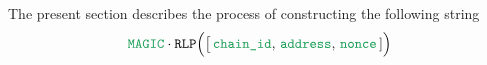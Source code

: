 The present section describes the process of constructing the following string
\[
	\locMagic \cdot \rlp\Big(\big[\,\locChainId, \, \locAddress, \, \locNonce \,]\Big)
\]
